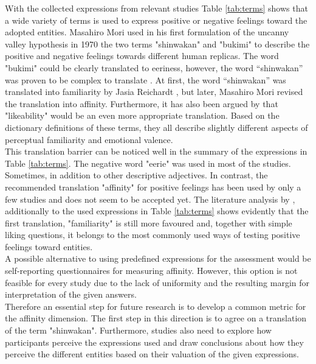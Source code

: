 With the collected expressions from relevant studies Table \ref{tab:terms} shows that a wide variety of terms is used to express positive or negative feelings toward the adopted entities. Masahiro Mori used in his first formulation of the uncanny valley hypothesis in 1970  \cite{original_masahiro_not_translated} the two terms "shinwakan" and "bukimi" to describe the positive and negative feelings towards different human replicas. The word "bukimi" could be clearly translated to eeriness, however, the word “shinwakan” was proven to be complex to translate \cite{quant_review}. At first, the word “shinwakan” was translated into familiarity by Jasia Reichardt \cite{first_translation}, but later, Masahiro Mori revised the translation into affinity. Furthermore, it has also been argued by \cite{uncanny_cliff} that "likeability" would be an even more appropriate translation. Based on the dictionary definitions of these terms, they all describe slightly different aspects of perceptual familiarity and emotional valence.\\
This translation barrier can be noticed well in the summary of the expressions in Table \ref{tab:terms}. The negative word "eerie" was used in most of the studies. Sometimes, in addition to other descriptive adjectives. In contrast, the recommended translation "affinity" for positive feelings has been used by only a few studies and does not seem to be accepted yet. The literature analysis by \cite{quant_review}, additionally to the used expressions in Table \ref{tab:terms} shows evidently that the first translation, "familiarity" is still more favoured and, together with simple liking questions, it belongs to the most commonly used ways of testing positive feelings toward entities.\\ %
A possible alternative to using predefined expressions for the assessment would be self-reporting questionnaires for measuring affinity. However, this option is not feasible for every study due to the lack of uniformity and the resulting margin for interpretation of the given answers.\\
Therefore an essential step for future research is to develop a common metric for the affinity dimension. The first step in this direction is to agree on a translation of the term "shinwakan". Furthermore, studies also need to explore how participants perceive the expressions used and draw conclusions about how they perceive the different entities based on their valuation of the given expressions. 
\newpage

